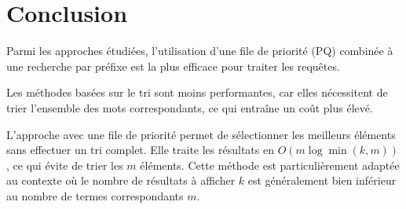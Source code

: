\section{Conclusion}

Parmi les approches étudiées,
l'utilisation d'une file de priorité (PQ) combinée à une recherche par préfixe est la plus efficace pour traiter les requêtes.

Les méthodes basées sur le tri sont moins performantes,
car elles nécessitent de trier l'ensemble des mots correspondants,
ce qui entraîne un coût plus élevé.

L'approche avec une file de priorité permet de sélectionner les meilleurs
éléments sans effectuer un tri complet. Elle traite les résultats en $O(m \log \min(k, m))$,
ce qui évite de trier les $m$ éléments.
Cette méthode est particulièrement adaptée au contexte où le nombre de résultats à afficher $k$
est généralement bien inférieur au nombre de termes correspondants $m$.
